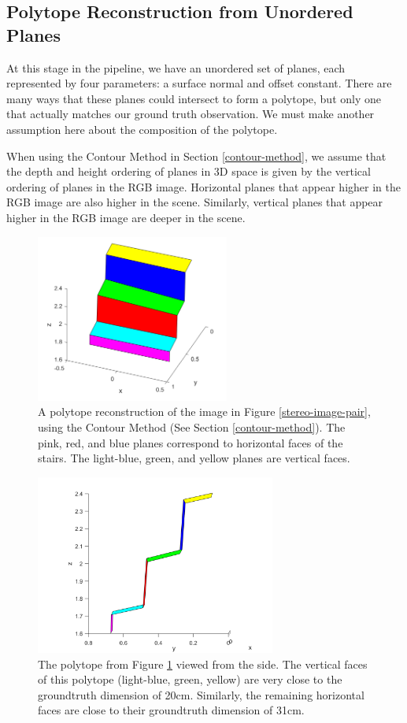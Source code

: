 \subsection{Polytope Reconstruction from Unordered Planes} \label{polytope-section}

At this stage in the pipeline, we have an unordered set of planes, each represented by four parameters: a surface normal and offset constant. There are many ways that these planes could intersect to form a polytope, but only one that actually matches our ground truth observation. We must make another assumption here about the composition of the polytope.

When using the Contour Method in Section \ref{contour-method}, we assume that the depth and height ordering of planes in 3D space is given by the vertical ordering of planes in the RGB image. Horizontal planes that appear higher in the RGB image are also higher in the scene. Similarly, vertical planes that appear higher in the RGB image are deeper in the scene.

\begin{figure}[!h]
\centering
\includegraphics[width=2.5in]{Sections/Figures/polytope_example.png}
\caption{A polytope reconstruction of the image in Figure \ref{stereo-image-pair}, using the Contour Method (See Section \ref{contour-method}). The pink, red, and blue planes correspond to horizontal faces of the stairs. The light-blue, green, and yellow planes are vertical faces.}
\label{polytope-diagonal-contour}
\end{figure}

\begin{figure}[!h]
\centering
\includegraphics[width=3.1in]{Sections/Figures/polytope_sideview.png}
\caption{The polytope from Figure \ref{polytope-diagonal-contour} viewed from the side. The vertical faces of this polytope (light-blue, green, yellow) are very close to the groundtruth dimension of 20cm. Similarly, the remaining horizontal faces are close to their groundtruth dimension of 31cm.}
\label{polytope-sideview-contour}
\end{figure}

